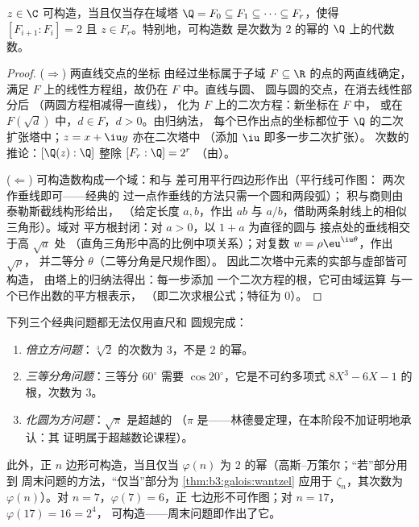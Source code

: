 \begin{theorem}[万策尔]\label{thm:b3:galois:wantzel}
$z \in \C$ 可构造，当且仅当存在域塔 $\Q = F_0
\subseteq F_1 \subseteq \dots \subseteq F_r$，使得 $[F_{i+1} :
F_i] = 2$ 且 $z \in F_r$。特别地，可构造数
是次数为 $2$ 的幂的
$\Q$ 上的代数数。
\end{theorem}

\begin{proof}
($\Rightarrow$) 两直线交点的坐标
由经过坐标属于子域 $F \subseteq \R$ 的点的两直线确定，
满足 $F$ 上的线性方程组，故仍在 $F$ 中。直线与圆、
圆与圆的交点，在消去线性部分后
（两圆方程相减得一直线），
化为 $F$ 上的二次方程：新坐标在 $F$ 中，
或在 $F(\sqrt d)$ 中，$d \in F$，$d > 0$。由归纳法，
每个已作出点的坐标都位于
$\Q$ 的二次扩张塔中；$z = x + \iu y$ 亦在二次塔中
（添加 $\iu$ 即多一步二次扩张）。
次数的推论：$[\Q(z):\Q]$ 整除 $[F_r : \Q] = 2^r$
（由）。

($\Leftarrow$) 可构造数构成一个域：和与
差可用平行四边形作出（平行线可作图：
两次作垂线即可——经典的
过一点作垂线的方法只需一个圆和两段弧）；
积与商则由泰勒斯截线构形给出，
（给定长度 $a, b$，作出 $ab$ 与
$a/b$，借助两条射线上的相似三角形）。域对
平方根封闭：对 $a > 0$，以 $1 + a$ 为直径的圆与
接点处的垂线相交于高 $\sqrt a$ 处
（直角三角形中高的比例中项关系）；对复数
$w = \rho\eu^{\iu\theta}$，作出 $\sqrt\rho$，
并二等分 $\theta$（二等分角是尺规作图）。
因此二次塔中元素的实部与虚部皆可构造，
由塔上的归纳法得出：每一步添加
一个二次方程的根，它可由域运算
与一个已作出数的平方根表示，
（即二次求根公式；特征为 $0$）。
\end{proof}

\begin{corollary}\label{cor:b3:galois:impossible}
下列三个经典问题都无法仅用直尺和
圆规完成：
\begin{enumerate}
  \item \emph{倍立方问题}：$\sqrt[3]2$ 的次数为
        $3$，不是 $2$ 的幂。
  \item \emph{三等分角问题}：三等分 $60^\circ$
        需要 $\cos 20^\circ$，它是不可约多项式 $8X^3
        - 6X - 1$ 的根，次数为 $3$。
  \item \emph{化圆为方问题}：$\sqrt\pi$ 是超越的
        （$\pi$ 是——林德曼定理，在本阶段不加证明地承认：其
        证明属于超越数论课程）。
\end{enumerate}
此外，正 $n$ 边形可构造，当且仅当
$\varphi(n)$ 为 $2$ 的幂（高斯–万策尔；“若”部分用到
周末问题的方法，“仅当”部分为
\cref{thm:b3:galois:wantzel} 应用于 $\zeta_n$，其次数为
$\varphi(n)$）。对 $n = 7$，$\varphi(7) = 6$，正
七边形不可作图；对 $n = 17$，$\varphi(17) = 16 = 2^4$，
可构造——周末问题即作出了它。
\end{corollary}

